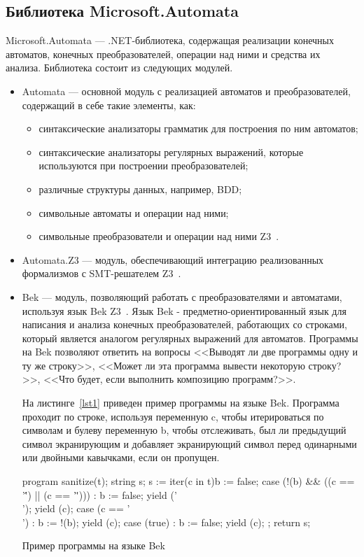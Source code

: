 \subsection{Библиотека Microsoft.Automata}
Microsoft.Automata --- .NET-библиотека, содержащая реализации конечных автоматов, конечных преобразователей, операции над ними и средства их анализа. Библиотека состоит из следующих модулей.
\begin{itemize}
\item Automata --- основной модуль с реализацией автоматов и преобразователей, содержащий в себе такие элементы, как:
    \begin{itemize}
    \item синтаксические анализаторы грамматик для построения по ним автоматов;
    \item синтаксические анализаторы регулярных выражений, которые используются при построении преобразователей;
    \item различные структуры данных, например, BDD;
    \item символьные автоматы и операции над ними;
    \item символьные преобразователи и операции над ними Z3~\cite{STcompose}. 
    \end{itemize}
\item Automata.Z3 --- модуль, обеспечивающий интеграцию реализованных формализмов с SMT-решателем Z3~\cite{Z3Url, articleZ3}.
\item Bek --- модуль, позволяющий работать с преобразователями и автоматами, используя язык Bek Z3~\cite{BekUrl, BekArticle}. Язык Bek - предметно-ориентированный язык для написания и анализа конечных преобразователей, работающих со строками, который является аналогом регулярных выражений для автоматов. Программы на Bek позволяют ответить на вопросы <<Выводят ли две программы одну и ту же строку>>, <<Может ли эта программа вывести некоторую строку?>>, <<Что будет, если выполнить композицию программ?>>.

На листинге~\ref{lst1} приведен пример программы на языке Bek. Программа проходит по строке, используя переменную c, чтобы итерироваться по символам и булеву переменную b, чтобы отслеживать, был ли предыдущий символ экранирующим и добавляет экранирующий символ перед одинарными или двойными кавычками, если он пропущен. 

\begin{listing}[H]
    \begin{pyglist}[language=csharp,numbers=left,numbersep=5pt]
program sanitize(t);
    string s; 
    s := iter(c in t){b := false;}{
            case (!(b) && ((c == '\'') || (c == '\"'))) :
                b := false;
                yield ('\\');
                yield (c);
            case (c == '\\') :
                b := !(b);
                yield (c);
            case (true) :
                b := false;
                yield (c);
            };
    return s;
    \end{pyglist}
\caption{Пример программы на языке Bek}
\label{lst1}
\end{listing}
\end{itemize}
